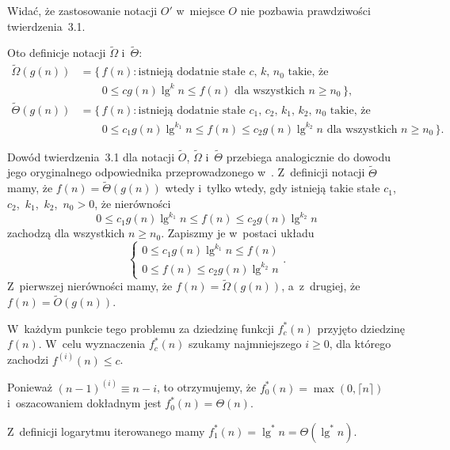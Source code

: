 Widać, że zastosowanie notacji $O'$ w~miejsce $O$ nie pozbawia prawdziwości twierdzenia~3.1.

\subproblem %
Oto definicje notacji $\widetilde{\Omega}$ i~$\widetilde{\Theta}$:
\[
	\begin{split}
		\widetilde{\Omega}(g(n)) &= \bigl\{\,f(n):\text{istnieją dodatnie stałe $c$,~$k$,~$n_0$ takie, że} \\
		&\qquad 0 \le cg(n)\lg^kn \le f(n) \text{ dla wszystkich $n \ge n_0$}\,\bigr\}, \\
		\widetilde{\Theta}(g(n)) &= \bigl\{\,f(n):\text{istnieją dodatnie stałe $c_1$,~$c_2$,~$k_1$,~$k_2$,~$n_0$ takie, że} \\
		&\qquad 0 \le c_1g(n)\lg^{k_1}n \le f(n) \le c_2g(n)\lg^{k_2}n \text{ dla wszystkich $n \ge n_0$}\,\bigr\}.
	\end{split}
\]

Dowód twierdzenia~3.1 dla notacji $\widetilde{O}$, $\widetilde{\Omega}$ i~$\widetilde{\Theta}$ przebiega analogicznie do dowodu jego oryginalnego odpowiednika przeprowadzonego w~. Z~definicji notacji $\widetilde{\Theta}$ mamy, że $f(n)=\widetilde{\Theta}(g(n))$ wtedy i~tylko wtedy, gdy istnieją takie stałe $c_1$,~$c_2$,~$k_1$,~$k_2$,~$n_0>0$, że nierówności
\[
	0 \le c_1g(n)\lg^{k_1}n \le f(n) \le c_2g(n)\lg^{k_2}n
\]
zachodzą dla wszystkich $n\ge n_0$. Zapiszmy je w~postaci układu
\[
	\begin{cases}
		0 \le c_1g(n)\lg^{k_1}n \le f(n) \\
		0 \le f(n) \le c_2g(n)\lg^{k_2}n
	\end{cases}.
\]
Z~pierwszej nierówności mamy, że $f(n)=\widetilde{\Omega}(g(n))$, a~z~drugiej, że $f(n)=\widetilde{O}(g(n))$.

W~każdym punkcie tego problemu za dziedzinę funkcji $f_c^*(n)$ przyjęto dziedzinę $f(n)$. W~celu wyznaczenia $f_c^*(n)$ szukamy najmniejszego $i\ge0$, dla którego zachodzi $f^{(i)}(n)\le c$.

\subproblem %

\noindent Ponieważ $(n-1)^{(i)}\equiv n-i$, to otrzymujemy, że $f_0^*(n)=\max(0,\lceil n\rceil)$ i~oszacowaniem dokładnym jest $f_0^*(n)=\Theta(n)$.

\subproblem %

\noindent Z~definicji logarytmu iterowanego mamy $f_1^*(n)=\lg^*n=\Theta(\lg^*n)$.

